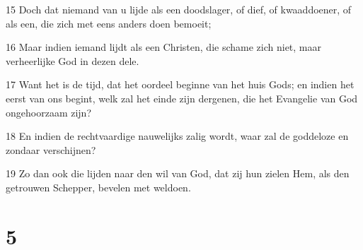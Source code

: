\par 15 Doch dat niemand van u lijde als een doodslager, of dief, of kwaaddoener, of als een, die zich met eens anders doen bemoeit;
\par 16 Maar indien iemand lijdt als een Christen, die schame zich niet, maar verheerlijke God in dezen dele.
\par 17 Want het is de tijd, dat het oordeel beginne van het huis Gods; en indien het eerst van ons begint, welk zal het einde zijn dergenen, die het Evangelie van God ongehoorzaam zijn?
\par 18 En indien de rechtvaardige nauwelijks zalig wordt, waar zal de goddeloze en zondaar verschijnen?
\par 19 Zo dan ook die lijden naar den wil van God, dat zij hun zielen Hem, als den getrouwen Schepper, bevelen met weldoen.

\chapter{5}

